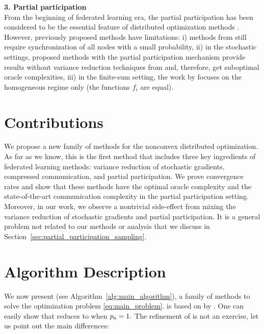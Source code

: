 \documentclass{article}
\newcommand{\algorithmname}{DARIA}
\newcommand*{\probavailable}{\ensuremath{p_{\textnormal{a}}}}
\begin{document}
\textbf{3. Partial participation} \\
From the beginning of federated learning era, the partial participation has been considered to be the essential feature of distributed optimization methods \citep{mcmahan2017communication, konevcny2016federated, kairouz2021advances}. 
However, previously proposed methods have limitations: i) methods from \citep{gorbunov2021marina, zhao2021fedpage} still require synchronization of all nodes with a small probability, ii) in the stochastic settings, proposed methods with the partial participation mechanism \citep{tyurin2022dasha, zhao2021faster} provide results without variance reduction techniques from \citep{SPIDER, PAGE, cutkosky2019momentum} and, therefore, get suboptimal oracle complexities, iii) in the finite-sum setting, the work by \cite{li2021zerosarah} focuses on the homogeneous regime only (the functions $f_i$ are equal).

\section{Contributions}
We propose a new family of methods \algname{\algorithmname} for the nonconvex distributed optimization. As far as we know, this is the first method that includes three key ingredients of federated learning methods: variance reduction of stochastic gradients, compressed communication, and partial participation. We prove convergence rates and show that these methods have the optimal oracle complexity and the state-of-the-art communication complexity in the partial participation setting. Moreover, in our work, we observe a nontrivial side-effect from mixing the variance reduction of stochastic gradients and partial participation. It is a general problem not related to our methods or analysis that we discuss in Section~\ref{sec:partial_participation_sampling}.

\section{Algorithm Description}

We now present \algname{\algorithmname} (see Algorithm~\ref{alg:main_algorithm}), a family of methods to solve the optimization problem \eqref{eq:main_problem}. \algname{\algorithmname} is based on  by \cite{tyurin2022dasha}. One can easily show that \algname{\algorithmname} reduces to  when $\probavailable = 1.$
The refinement of  is not an exercise, let us point out the main differences: 
\end{document}
